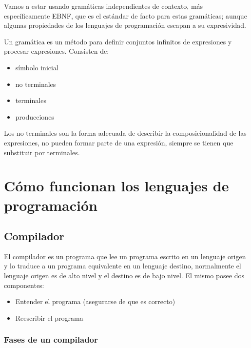 \documentclass[10pt,a4paper]{report}
\begin{document}
    \par Vamos a estar usando gramáticas independientes de contexto, más específicamente EBNF, que es el estándar de   
        facto para estas gramáticas; aunque algunas propiedades de los lenguajes de programación escapan a su 
        expresividad.

    \par Un gramática es un método para definir conjuntos infinitos de expresiones y procesar expresiones. Consisten 
        de: 

        \begin{itemize}
            \item símbolo inicial
            \item no terminales
            \item terminales
            \item producciones
        \end{itemize}

    \par Los no terminales son la forma adecuada de describir la composicionalidad de las expresiones, no pueden formar
        parte de una expresión, siempre se tienen que substituir por terminales.

\chapter{Cómo funcionan los lenguajes de programación}

    \section{Compilador}

        \par El compilador es un programa que lee un programa escrito en un lenguaje origen y lo traduce a un programa 
            equivalente en un lenguaje destino, normalmente el lenguaje origen es de alto nivel y el destino es de 
            bajo nivel. El mismo posee dos componentes:

        \begin{itemize}
            \item Entender el programa (asegurarse de que es correcto)
            \item Reescribir el programa
        \end{itemize}

        \subsection{Fases de un compilador}
\end{document}
